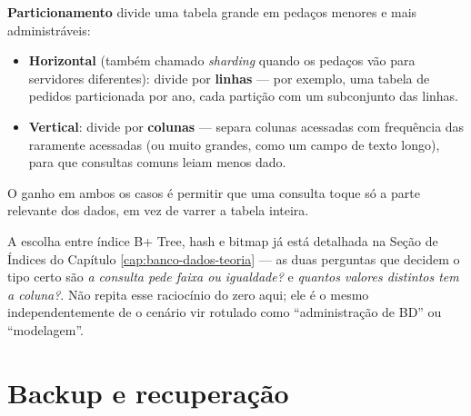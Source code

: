\begin{conceito}
\textbf{Particionamento} divide uma tabela grande em pedaços menores e mais
administráveis:
\begin{itemize}
\item \textbf{Horizontal} (também chamado \textit{sharding} quando os
pedaços vão para servidores diferentes): divide por \textbf{linhas} --- por
exemplo, uma tabela de pedidos particionada por ano, cada partição com um
subconjunto das linhas.
\item \textbf{Vertical}: divide por \textbf{colunas} --- separa colunas
acessadas com frequência das raramente acessadas (ou muito grandes, como
um campo de texto longo), para que consultas comuns leiam menos dado.
\end{itemize}
O ganho em ambos os casos é permitir que uma consulta toque só a parte
relevante dos dados, em vez de varrer a tabela inteira.
\end{conceito}

\begin{regrapratica}
A escolha entre índice B+ Tree, hash e bitmap já está detalhada na Seção de
Índices do Capítulo \ref{cap:banco-dados-teoria} --- as duas perguntas que
decidem o tipo certo são \textit{a consulta pede faixa ou igualdade?} e
\textit{quantos valores distintos tem a coluna?}. Não repita esse
raciocínio do zero aqui; ele é o mesmo independentemente de o cenário vir
rotulado como “administração de BD” ou “modelagem”.
\end{regrapratica}

\section{Backup e recuperação}

